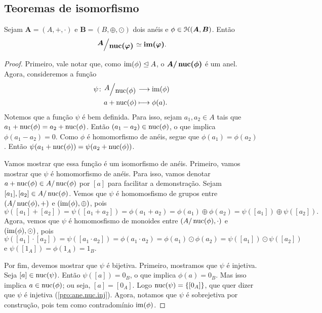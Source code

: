 \subsection{Teoremas de isomorfismo}

\begin{theorem}
\label{teo:iso1}
	Sejam $\bm A=(A,+,\cdot)$ e $\bm B=(B,\oplus,\odot)$ dois anéis e $\phi \in \mathcal{H}(\bm A,\bm B)$. Então
	\begin{equation*}
	\bm{\quo{A}{\nuc(\varphi)}} \simeq \bm{\im(\varphi)}.
	\end{equation*}
\end{theorem}
\begin{proof}
	Primeiro, vale notar que, como $\operatorname{im}(\phi) \mathrel{\unlhd} A$, o $\bm{A/\nuc(\phi)}$ é um anel. Agora, consideremos a função
	\begin{align*}
	\func{\psi}{\quo{A}{\nuc(\phi)}}{\im(\phi)}{a+\nuc(\phi)}{\phi(a).}
	\end{align*}
Notemos que a função $\psi$ é bem definida. Para isso, sejam $a_1,a_2 \in A$ tais que $a_1+\operatorname{nuc}(\phi)=a_2+\operatorname{nuc}(\phi)$. Então $(a_1-a_2) \in \operatorname{nuc}(\phi)$, o que implica $\phi(a_1-a_2)=0$. Como $\phi$ é homomorfismo de anéis, segue que $\phi(a_1)=\phi(a_2)$. Então $\psi(a_1+\operatorname{nuc}(\phi)) = \psi(a_2+\operatorname{nuc}(\phi))$.

	Vamos mostrar que essa função é um isomorfismo de anéis. Primeiro, vamos mostrar que $\psi$ é homomorfismo de anéis. Para isso, vamos denotar $a+\operatorname{nuc}(\phi) \in A/\operatorname{nuc}(\phi)$ por $[a]$ para facilitar a demonstração. Sejam $[a_1],[a_2] \in A/\operatorname{nuc}(\phi)$. Vemos que $\psi$ é homomosfismo de grupos entre $(A/\operatorname{nuc}(\phi),+)$ e $(\operatorname{im}(\phi),\oplus)$, pois
	\begin{equation*}
	\psi([a_1]+[a_2]) = \psi([a_1+a_2]) = \phi(a_1+a_2) = \phi(a_1) \oplus \phi(a_2) = \psi([a_1]) \oplus \psi([a_2]).
	\end{equation*}
Agora, vemos que $\psi$ é homomosfismo de monoides entre $(A/\operatorname{nuc}(\phi),\cdot)$ e $(\operatorname{im}(\phi),\odot)$, pois
	\begin{equation*}
	\psi([a_1] \cdot [a_2]) = \psi([a_1 \cdot a_2]) = \phi(a_1 \cdot a_2) = \phi(a_1) \odot \phi(a_2) = \psi([a_1]) \odot \psi([a_2])
	\end{equation*}
e $\psi([1_A]) = \phi(1_A) = 1_B$.

	Por fim, devemos mostrar que $\psi$ é bijetiva. Primeiro, mostramos que $\psi$ é injetiva. Seja $[a] \in \operatorname{nuc}(\psi)$. Então $\psi([a])=0_B$, o que implica $\phi(a)=0_B$. Mas isso implica $a \in \operatorname{nuc}(\phi)$; ou seja, $[a]=[0_A]$. Logo $\operatorname{nuc}(\psi)=\{[0_A]\}$, que quer dizer que $\psi$ é injetiva (\ref{pro:ane.nuc.inj}). Agora, notamos que $\psi$ é sobrejetiva por construção, pois tem como contradomínio $\operatorname{im}(\phi)$.
\end{proof}

